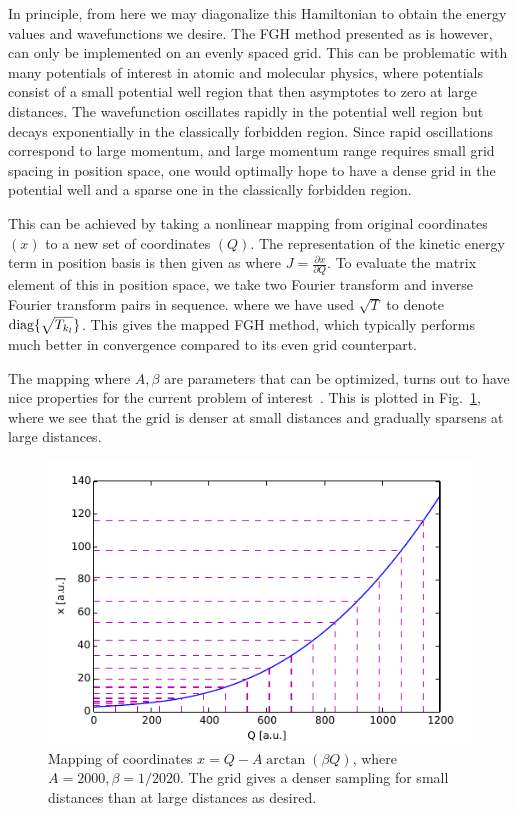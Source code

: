 \documentclass[%
 reprint,
 amsmath,amssymb,
 aps,
 nofootinbib
]{revtex4-1}
\begin{document}
In principle, from here we may diagonalize this Hamiltonian to obtain the energy values and wavefunctions we desire. The FGH method presented as is however, can only be implemented on an evenly spaced grid. This can be problematic with many potentials of interest in atomic and molecular physics, where potentials consist of a small potential well region that then asymptotes to zero at large distances. The wavefunction oscillates rapidly in the potential well region but decays exponentially in the classically forbidden region. Since rapid oscillations correspond to large momentum, and large momentum range requires small grid spacing in position space, one would optimally hope to have a dense grid in the potential well and a sparse one in the classically forbidden region.

This can be achieved by taking a nonlinear mapping from original coordinates $(x)$ to a new set of coordinates $(Q)$. The representation of the kinetic energy term in position basis is then given as 
where $J=\frac{\partial x}{\partial Q}$. To evaluate the matrix element of this in position space, we take two Fourier transform and inverse Fourier transform pairs in sequence. 
where we have used $\sqrt{T}$ to denote $\text{diag}\{\sqrt{T_{k_l}}\}$. This gives the mapped FGH method, which typically performs much better in convergence compared to its even grid counterpart.

The mapping 
where $A,\beta$ are parameters that can be optimized, turns out to have nice properties for the current problem of interest~\cite{fattel1996}. This is plotted in Fig.~\ref{fig:mapping}, where we see that the grid is denser at small distances and gradually sparsens at large distances.

\begin{figure}
\includegraphics{figures/mapping}
\caption{\label{fig:mapping}Mapping of coordinates $x = Q-A\arctan(\beta Q)$, where $A=2000, \beta = 1/2020$. The grid gives a denser sampling for small distances than at large distances as desired.}
\end{figure}
\end{document}
